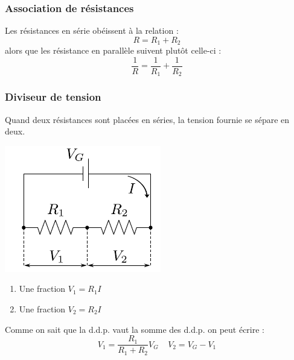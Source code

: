 \documentclass	[11pt, a4paper, openany]{book}
\begin{document}
\subsubsection*{Association de résistances}
Les résistances en série obéissent à la relation :
\begin{equation}
R = R_1 + R_2
\end{equation}
alors que les résistance en parallèle suivent plutôt celle-ci :
\begin{equation}
\frac{1}{R} = \frac{1}{R_1} + \frac{1}{R_2}
\end{equation}

\subsubsection*{Diviseur de tension}
Quand deux résistances sont placées en séries, la tension fournie se sépare en deux.
\begin{center}
\includegraphics[scale=0.5]{labo/image9.png}
\end{center}
\begin{enumerate}
\item Une fraction $V_1 = R_1I$
\item Une fraction $V_2 = R_2I$
\end{enumerate}
Comme on sait que la d.d.p. vaut la somme des d.d.p. on peut écrire : 
\begin{equation}
V_1 = \frac{R_1}{R_1 + R_2}V_G\ \ \ \ \ V_2 = V_G - V_1
\end{equation}
\end{document}
